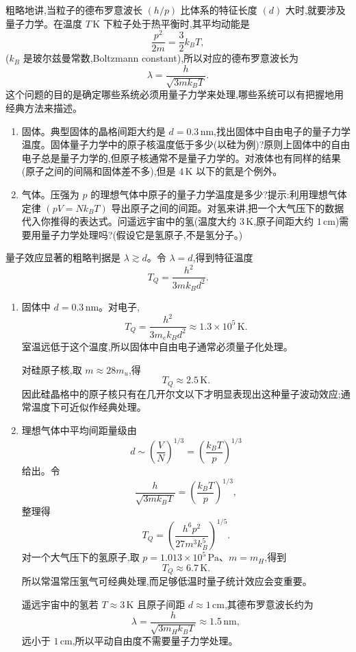 \begin{question}
粗略地讲,当粒子的德布罗意波长 $(h/p)$ 比体系的特征长度 $(d)$ 大时,就要涉及量子力学。在温度 $T\,\mathrm{K}$ 下粒子处于热平衡时,其平均动能是
\[
\frac{p^2}{2m}=\frac{3}{2}k_B T,
\]
($k_B$ 是玻尔兹曼常数,Boltzmann constant),所以对应的德布罗意波长为
\[
\lambda=\frac{h}{\sqrt{3mk_B T}}.
\tag{1.45}
\]
这个问题的目的是确定哪些系统必须用量子力学来处理,哪些系统可以有把握地用经典方法来描述。
\begin{enumerate}
\item 固体。典型固体的晶格间距大约是 $d=0.3\,\mathrm{nm}$,找出固体中自由电子的量子力学温度。固体量子力学中的原子核温度低于多少(以硅为例)?原则上固体中的自由电子总是量子力学的,但原子核通常不是量子力学的。对液体也有同样的结果(原子之间的间隔和固体差不多),但是 $4\,\mathrm{K}$ 以下的氦是个例外。
\item 气体。压强为 $p$ 的理想气体中原子的量子力学温度是多少?提示:利用理想气体定律 $(pV=Nk_BT)$ 导出原子之间的间距。对氢来讲,把一个大气压下的数据代入你推得的表达式。问遥远宇宙中的氢(温度大约 $3\,\mathrm{K}$,原子间距大约 $1\,\mathrm{cm}$)需要用量子力学处理吗?(假设它是氢原子,不是氢分子。)
\end{enumerate}
\begin{solution}
量子效应显著的粗略判据是 $\lambda\gtrsim d$。令 $\lambda=d$,得到特征温度
\[
T_Q=\frac{h^2}{3mk_Bd^2}.
\]
\begin{enumerate}
\item 固体中 $d=0.3\,\mathrm{nm}$。对电子,
\[
T_Q=\frac{h^2}{3m_ek_Bd^2}\approx 1.3\times10^5\,\mathrm{K}.
\]
室温远低于这个温度,所以固体中自由电子通常必须量子化处理。

对硅原子核,取 $m\approx 28m_u$,得
\[
T_Q\approx 2.5\,\mathrm{K}.
\]
因此硅晶格中的原子核只有在几开尔文以下才明显表现出这种量子波动效应;通常温度下可近似作经典处理。
\item 理想气体中平均间距量级由
\[
d\sim\left(\frac{V}{N}\right)^{1/3}=\left(\frac{k_BT}{p}\right)^{1/3}
\]
给出。令
\[
\frac{h}{\sqrt{3mk_BT}}=\left(\frac{k_BT}{p}\right)^{1/3},
\]
整理得
\[
T_Q=\left(\frac{h^6p^2}{27m^3k_B^5}\right)^{1/5}.
\]
对一个大气压下的氢原子,取 $p=1.013\times10^5\,\mathrm{Pa}$、$m=m_H$,得到
\[
T_Q\approx 6.7\,\mathrm{K}.
\]
所以常温常压氢气可经典处理,而足够低温时量子统计效应会变重要。

遥远宇宙中的氢若 $T\approx3\,\mathrm{K}$ 且原子间距 $d\approx1\,\mathrm{cm}$,其德布罗意波长约为
\[
\lambda=\frac{h}{\sqrt{3m_Hk_BT}}\approx1.5\,\mathrm{nm},
\]
远小于 $1\,\mathrm{cm}$,所以平动自由度不需要量子力学处理。
\end{enumerate}
\end{solution}
\end{question}
